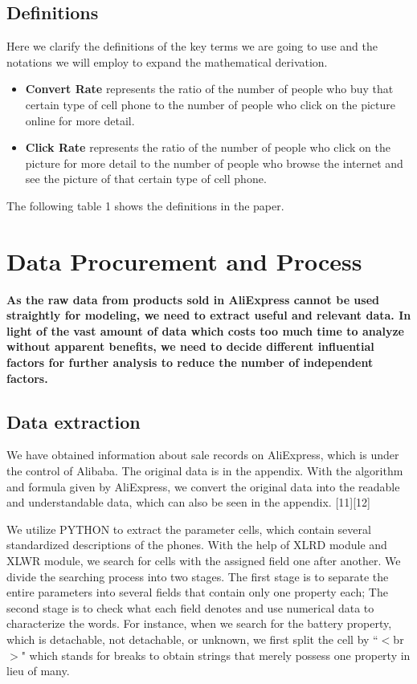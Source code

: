 \subsection{Definitions}

Here we clarify the definitions of the key terms we are going to use and the notations we will employ to expand the mathematical derivation. 

\begin{itemize}
	\item \textbf{Convert Rate} represents the ratio of the number of people who buy that certain type of cell phone to the number of people who click on the picture online for more detail. 

\end{itemize}
\begin{itemize}
	\item \textbf{Click Rate} represents the ratio of the number of people who click on the picture for more detail to the number of people who browse the internet and see the picture of that certain type of cell phone.
\end{itemize} 


The following table 1 shows the definitions in the paper. 

\section{Data Procurement and Process}

\textbf{As the raw data from products sold in AliExpress cannot be used straightly for modeling, we need to extract useful and relevant data. In light of the vast amount of data which costs too much time to analyze without apparent benefits, we need to decide different influential factors for further analysis to reduce the number of independent factors.}

\subsection{Data extraction}

We have obtained information about sale records on AliExpress, which is under the control of Alibaba. The original data is in the appendix. With the algorithm and formula given by AliExpress, we convert the original data into the readable and understandable data, which can also be seen in the appendix. [11][12]

We utilize PYTHON to extract the parameter cells, which contain several standardized descriptions of the phones. With the help of XLRD module and XLWR module, we search for cells with the assigned field one after another. We divide the searching process into two stages. The first stage is to separate the entire parameters into several fields that contain only one property each; The second stage is to check what each field denotes and use numerical data to characterize the words. For instance, when we search for the battery property, which is detachable, not detachable, or unknown, we first split the cell by ``$<$br$>$" which stands for breaks to obtain strings that merely possess one property in lieu of many. 

